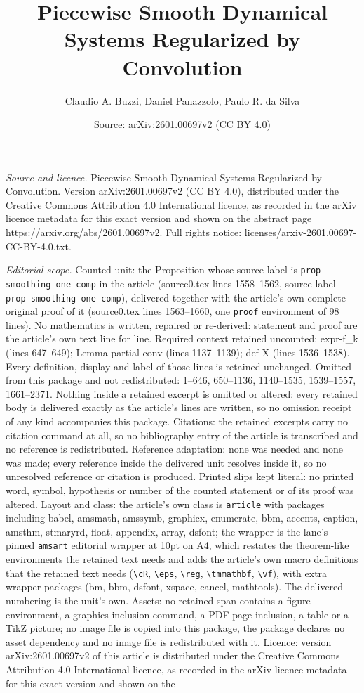\documentclass[10pt,a4paper]{amsart}
\title[Piecewise Smooth Dynamical Systems Regularized by Convolutio]{Piecewise Smooth Dynamical Systems Regularized by Convolution}
\author{Claudio A. Buzzi, Daniel Panazzolo, Paulo R. da Silva}
\date{Source: arXiv:2601.00697v2 (CC BY 4.0)}
\begin{document}
\maketitle

\noindent\emph{Source and licence.} Piecewise Smooth Dynamical Systems Regularized by Convolution. Version arXiv:2601.00697v2 (CC BY 4.0), distributed under the Creative Commons Attribution 4.0 International licence, as recorded in the arXiv licence metadata for this exact version and shown on the abstract page https://arxiv.org/abs/2601.00697v2. Full rights notice: licenses/arxiv-2601.00697-CC-BY-4.0.txt.\par\smallskip

\noindent\textit{Editorial scope.} Counted unit: the Proposition whose source label is \texttt{prop-smoothing-one-comp} in the article (source0.tex lines 1558--1562, source label \texttt{prop-smoothing-one-comp}), delivered together with the article's own complete original proof of it (source0.tex lines 1563--1660, one \texttt{proof} environment of 98 lines). No mathematics is written, repaired or re-derived: statement and proof are the article's own text line for line. Required context retained uncounted: expr-f\_k (lines 647--649); Lemma-partial-conv (lines 1137--1139); def-X (lines 1536--1538). Every definition, display and label of those lines is retained unchanged. Omitted from this package and not redistributed: 1--646, 650--1136, 1140--1535, 1539--1557, 1661--2371. Nothing inside a retained excerpt is omitted or altered: every retained body is delivered exactly as the article's lines are written, so no omission receipt of any kind accompanies this package. Citations: the retained excerpts carry no citation command at all, so no bibliography entry of the article is transcribed and no reference is redistributed. Reference adaptation: none was needed and none was made; every reference inside the delivered unit resolves inside it, so no unresolved reference or citation is produced. Printed slips kept literal: no printed word, symbol, hypothesis or number of the counted statement or of its proof was altered. Layout and class: the article's own class is \texttt{article} with packages including babel, amsmath, amssymb, graphicx, enumerate, bbm, accents, caption, amsthm, stmaryrd, float, appendix, array, dsfont; the wrapper is the lane's pinned \texttt{amsart} editorial wrapper at 10pt on A4, which restates the theorem-like environments the retained text needs and adds the article's own macro definitions that the retained text needs (\texttt{\textbackslash cR}, \texttt{\textbackslash eps}, \texttt{\textbackslash reg}, \texttt{\textbackslash tmmathbf}, \texttt{\textbackslash vf}), with extra wrapper packages (bm, bbm, dsfont, xspace, cancel, mathtools). The delivered numbering is the unit's own. Assets: no retained span contains a figure environment, a graphics-inclusion command, a PDF-page inclusion, a table or a TikZ picture; no image file is copied into this package, the package declares no asset dependency and no image file is redistributed with it. Licence: version arXiv:2601.00697v2 of this article is distributed under the Creative Commons Attribution 4.0 International licence, as recorded in the arXiv licence metadata for this exact version and shown on the 
\end{document}
